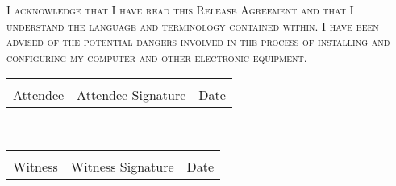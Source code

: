 \documentclass[11pt,draft]{article}
\newcommand{\printsigndate}[1]{%
    \vspace{5mm}
    \begin{tabularx}{\textwidth}{S S D}
        \hrulefill{} & \hrulefill{} & \hrulefill{} \\
        \strut{}#1\strut{}&
        \strut{}#1 Signature\strut{}&
        \strut{}Date\strut{}
    \end{tabularx}%
}
\begin{document}
\vfill

{\scshape I acknowledge that I have read this Release Agreement and that
    I understand the language and terminology contained within. I have
    been advised of the potential dangers involved in the process of
    installing and configuring my computer and other electronic
    equipment.
}

\begin{flushright}
\printsigndate{Attendee} \\
\printsigndate{Witness} \\
\end{flushright}
\end{document}
